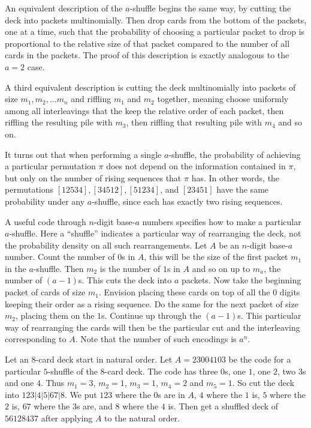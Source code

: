 \documentclass[12pt]{article}
\begin{document}
An equivalent description of the \( a \)-shuffle begins the same way, by
cutting the deck into packets multinomially.  Then drop cards from the
bottom of the packets, one at a time, such that the probability of
choosing a particular packet to drop is proportional to the relative
size of that packet compared to the number of all cards in the packets.
The proof of this description is exactly analogous to the \( a = 2 \)
case.

A third equivalent description is cutting the deck multinomially into
packets of size \( m_1, m_2, \dots m_n \) and riffling \( m_1 \) and \(
m_2 \) together, meaning choose uniformly among all interleavings that
the keep the relative order of each packet, then riffling the resulting
pile with \( m_3 \), then riffling that resulting pile with \( m_4 \)
and so on.

It turns out that when performing a single \( a \)-shuffle, the
probability of achieving a particular permutation \( \pi \) does not
depend on the information contained in \( \pi \), but only on the number
of rising sequences that \( \pi \) has.  In other words, the
permutations \( [12534], [34512], [51234] \), and \( [23451] \) have the
same probability under any \( a \)-shuffle, since each has exactly two
rising sequences.

A useful code through \( n \)-digit base-\( a \) numbers specifies how
to make a particular \( a \)-shuffle.  Here a ``shuffle'' indicates a
particular way of rearranging the deck, not the probability density on
all such rearrangements.  Let \( A \) be an \( n \)-digit base-\( a \)
number.  Count the number of \( 0 \)s in \( A \), this will be the size
of the first packet \( m_1 \) in the \( a \)-shuffle.  Then \( m_2 \) is
the number of \( 1 \)s in \( A \) and so on up to \( m_a \), the number
of \( (a-1) \)s.  This cuts the deck into \( a \) packets.  Now take the
beginning packet of cards of size \( m_1 \).  Envision placing these
cards on top of all the \( 0 \) digits keeping their order as a rising
sequence.  Do the same for the next packet of size \( m_2 \), placing
them on the \( 1 \)s.  Continue up through the \( (a-1) \)s.  This
particular way of rearranging the cards will then be the particular cut
and the interleaving corresponding to \( A \).  Note that the number of
such encodings is \( a^n \).

\begin{example}
    Let an 8-card deck start in natural order.  Let \( A = 23004103 \) be the
    code for a particular \( 5 \)-shuffle of the \( 8 \)-card deck.  The
    code has three \( 0 \)s, one \( 1 \), one \( 2 \), two \( 3 \)s and one \(
    4 \).  Thus \( m_1 = 3 \), \( m_2 = 1 \), \( m_3 =1 \), \( m_4 = 2 \)
    and \( m_5 = 1 \).  So cut the deck into \( 123|4|5|67|8 \).  We put
    \( 123 \) where the \( 0 \)s are in \( A \), \( 4 \) where the \( 1 \)
    is, \( 5 \) where the \( 2 \) is, \( 67 \) where the \( 3 \)s are,
    and \( 8 \) where the \( 4 \) is.  Then get a shuffled deck of \(
    56128437 \) after applying \( A \) to the natural order.
\end{example}
\end{document}
